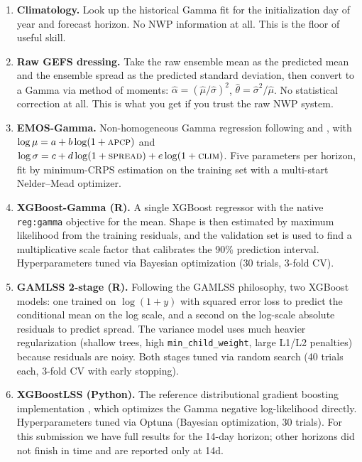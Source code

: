 \documentclass[11pt]{article}
\begin{document}
\begin{enumerate}[leftmargin=1.3em]
    \item[\textbf{B1.}] \textbf{Climatology.} Look up the historical Gamma fit for the initialization day of year and forecast horizon. No NWP information at all. This is the floor of useful skill.
    \item[\textbf{B2.}] \textbf{Raw GEFS dressing.} Take the raw ensemble mean as the predicted mean and the ensemble spread as the predicted standard deviation, then convert to a Gamma via method of moments: $\hat{\alpha} = (\hat{\mu}/\hat{\sigma})^2$, $\hat{\theta} = \hat{\sigma}^2/\hat{\mu}$. No statistical correction at all. This is what you get if you trust the raw NWP system.
    \item[\textbf{B3.}] \textbf{EMOS-Gamma.} Non-homogeneous Gamma regression following \citet{gneiting2005} and \citet{scheuerer2014}, with $\log \mu = a + b\log(1+\textsc{apcp})$ and $\log \sigma = c + d\log(1+\textsc{spread}) + e\log(1+\textsc{clim})$. Five parameters per horizon, fit by minimum-CRPS estimation on the training set with a multi-start Nelder--Mead optimizer.
    \item[\textbf{M1.}] \textbf{XGBoost-Gamma (R).} A single XGBoost regressor with the native \texttt{reg:gamma} objective for the mean. Shape is then estimated by maximum likelihood from the training residuals, and the validation set is used to find a multiplicative scale factor that calibrates the 90\% prediction interval. Hyperparameters tuned via Bayesian optimization (30 trials, 3-fold CV).
    \item[\textbf{M2.}] \textbf{GAMLSS 2-stage (R).} Following the GAMLSS philosophy, two XGBoost models: one trained on $\log(1+y)$ with squared error loss to predict the conditional mean on the log scale, and a second on the log-scale absolute residuals to predict spread. The variance model uses much heavier regularization (shallow trees, high \texttt{min\_child\_weight}, large L1/L2 penalties) because residuals are noisy. Both stages tuned via random search (40 trials each, 3-fold CV with early stopping).
    \item[\textbf{M3.}] \textbf{XGBoostLSS (Python).} The reference distributional gradient boosting implementation \citep{marz2022}, which optimizes the Gamma negative log-likelihood directly. Hyperparameters tuned via Optuna (Bayesian optimization, 30 trials). For this submission we have full results for the 14-day horizon; other horizons did not finish in time and are reported only at 14d.
\end{enumerate}
\end{document}
